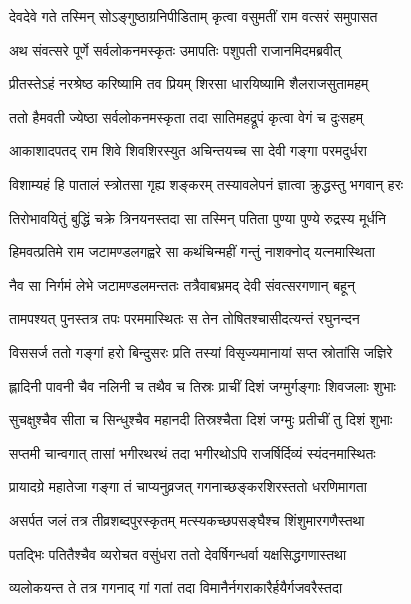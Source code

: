 
\twolineshloka
{देवदेवे गते तस्मिन् सोऽङ्गुष्ठाग्रनिपीडिताम्}
{कृत्वा वसुमतीं राम वत्सरं समुपासत} %

\twolineshloka
{अथ संवत्सरे पूर्णे सर्वलोकनमस्कृतः}
{उमापतिः पशुपती राजानमिदमब्रवीत्} %

\twolineshloka
{प्रीतस्तेऽहं नरश्रेष्ठ करिष्यामि तव प्रियम्}
{शिरसा धारयिष्यामि शैलराजसुतामहम्} %

\twolineshloka
{ततो हैमवती ज्येष्ठा सर्वलोकनमस्कृता}
{तदा सातिमहद्रूपं कृत्वा वेगं च दुःसहम्} %

\twolineshloka
{आकाशादपतद् राम शिवे शिवशिरस्युत}
{अचिन्तयच्च सा देवी गङ्गा परमदुर्धरा} %

\twolineshloka
{विशाम्यहं हि पातालं स्त्रोतसा गृह्य शङ्करम्}
{तस्यावलेपनं ज्ञात्वा क्रुद्धस्तु भगवान् हरः} %

\twolineshloka
{तिरोभावयितुं बुद्धिं चक्रे त्रिनयनस्तदा}
{सा तस्मिन् पतिता पुण्या पुण्ये रुद्रस्य मूर्धनि} %

\twolineshloka
{हिमवत्प्रतिमे राम जटामण्डलगह्वरे}
{सा कथंचिन्महीं गन्तुं नाशक्नोद् यत्नमास्थिता} %

\twolineshloka
{नैव सा निर्गमं लेभे जटामण्डलमन्ततः}
{तत्रैवाबभ्रमद् देवी संवत्सरगणान् बहून्} %

\twolineshloka
{तामपश्यत् पुनस्तत्र तपः परममास्थितः}
{स तेन तोषितश्चासीदत्यन्तं रघुनन्दन} %

\twolineshloka
{विससर्ज ततो गङ्गां हरो बिन्दुसरः प्रति}
{तस्यां विसृज्यमानायां सप्त स्रोतांसि जज्ञिरे} %

\twolineshloka
{ह्लादिनी पावनी चैव नलिनी च तथैव च}
{तिस्रः प्राचीं दिशं जग्मुर्गङ्गाः शिवजलाः शुभाः} %

\twolineshloka
{सुचक्षुश्चैव सीता च सिन्धुश्चैव महानदी}
{तिस्रश्चैता दिशं जग्मुः प्रतीचीं तु दिशं शुभाः} %

\twolineshloka
{सप्तमी चान्वगात् तासां भगीरथरथं तदा}
{भगीरथोऽपि राजर्षिर्दिव्यं स्यंदनमास्थितः} %

\twolineshloka
{प्रायादग्रे महातेजा गङ्गा तं चाप्यनुव्रजत्}
{गगनाच्छङ्करशिरस्ततो धरणिमागता} %

\twolineshloka
{असर्पत जलं तत्र तीव्रशब्दपुरस्कृतम्}
{मत्स्यकच्छपसङ्घैश्च शिंशुमारगणैस्तथा} %

\twolineshloka
{पतद्भिः पतितैश्चैव व्यरोचत वसुंधरा}
{ततो देवर्षिगन्धर्वा यक्षसिद्धगणास्तथा} %

\twolineshloka
{व्यलोकयन्त ते तत्र गगनाद् गां गतां तदा}
{विमानैर्नगराकारैर्हयैर्गजवरैस्तदा} %

